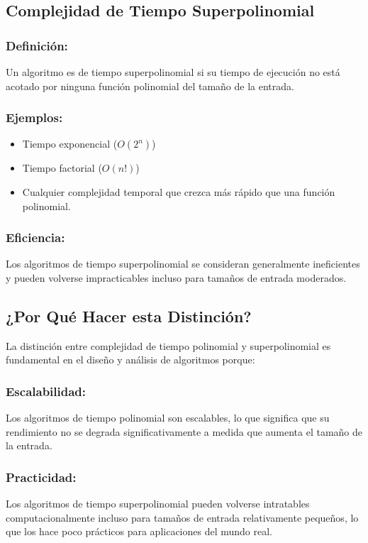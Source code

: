 \documentclass[letter, 12pt]{article}
\begin{document}
    \subsection{Complejidad de Tiempo Superpolinomial}

    \subsubsection{Definición:}
    Un algoritmo es de tiempo superpolinomial si su tiempo de ejecución no está acotado por ninguna función polinomial del tamaño de la entrada.

    \subsubsection{Ejemplos:}
    \begin{itemize}
        \item Tiempo exponencial ($O(2^n)$)
        \item Tiempo factorial ($O(n!)$)
        \item Cualquier complejidad temporal que crezca más rápido que una función polinomial.
    \end{itemize}

    \subsubsection{Eficiencia:}
    Los algoritmos de tiempo superpolinomial se consideran generalmente ineficientes y pueden volverse impracticables incluso para tamaños de entrada moderados.

    \subsection{¿Por Qué Hacer esta Distinción?}
    La distinción entre complejidad de tiempo polinomial y superpolinomial es fundamental en el diseño y análisis de algoritmos porque:

    \subsubsection{Escalabilidad:}
    Los algoritmos de tiempo polinomial son escalables, lo que significa que su rendimiento no se degrada significativamente a medida que aumenta el tamaño de la entrada.

    \subsubsection{Practicidad:}
    Los algoritmos de tiempo superpolinomial pueden volverse intratables computacionalmente incluso para tamaños de entrada relativamente pequeños, lo que los hace poco prácticos para aplicaciones del mundo real.
\end{document}
